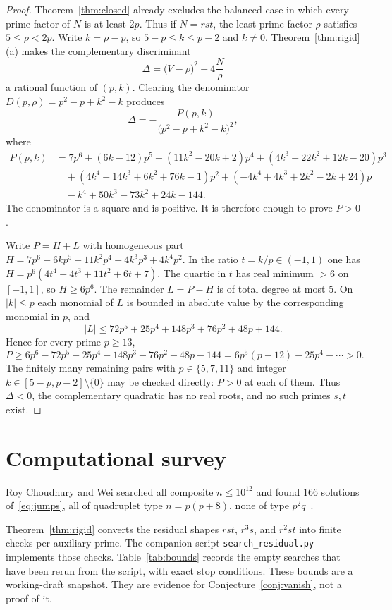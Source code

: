 \documentclass[11pt,reqno]{amsart}
\theoremstyle{definition}
\begin{document}
\begin{proof}
Theorem~\ref{thm:closed} already excludes the balanced case in which every prime factor of \(N\) is at least \(2p\). Thus if \(N=rst\), the least prime factor \(\rho\) satisfies \(5\le\rho<2p\). Write \(k=\rho-p\), so \(5-p\le k\le p-2\) and \(k\neq 0\). Theorem~\ref{thm:rigid}(a) makes the complementary discriminant
\[
\Delta=\bigl(V-\rho\bigr)^2-4\frac{N}{\rho}
\]
a rational function of \((p,k)\). Clearing the denominator \(D(p,\rho)=p^2-p+k^2-k\) produces
\[
\Delta=-\frac{P(p,k)}{\bigl(p^2-p+k^2-k\bigr)^2},
\]
where
\begin{align*}
P(p,k)&=7p^6+(6k-12)p^5+(11k^2-20k+2)p^4+(4k^3-22k^2+12k-20)p^3\\
&\quad+(4k^4-14k^3+6k^2+76k-1)p^2+(-4k^4+4k^3+2k^2-2k+24)p\\
&\quad-k^4+50k^3-73k^2+24k-144.
\end{align*}
The denominator is a square and is positive. It is therefore enough to prove \(P>0\).

Write \(P=H+L\) with homogeneous part \(H=7p^6+6kp^5+11k^2p^4+4k^3p^3+4k^4p^2\). In the ratio \(t=k/p\in(-1,1)\) one has \(H=p^6(4t^4+4t^3+11t^2+6t+7)\). The quartic in \(t\) has real minimum \(>6\) on \([-1,1]\), so \(H\ge 6p^6\). The remainder \(L=P-H\) is of total degree at most \(5\). On \(|k|\le p\) each monomial of \(L\) is bounded in absolute value by the corresponding monomial in \(p\), and
\[
|L|\le 72p^5+25p^4+148p^3+76p^2+48p+144.
\]
Hence for every prime \(p\ge 13\),
\[
P\ge 6p^6-72p^5-25p^4-148p^3-76p^2-48p-144=6p^5(p-12)-25p^4-\cdots>0.
\]
The finitely many remaining pairs with \(p\in\{5,7,11\}\) and integer \(k\in[5-p,p-2]\setminus\{0\}\) may be checked directly: \(P>0\) at each of them. Thus \(\Delta<0\), the complementary quadratic has no real roots, and no such primes \(s,t\) exist.
\end{proof}

\section{Computational survey}

\label{sec:comp}

Roy Choudhury and Wei searched all composite \(n\le 10^{12}\) and found \(166\) solutions of~\eqref{eq:jumps}, all of quadruplet type \(n=p(p+8)\), none of type \(p^2q\)~\cite{RCW2026}.

Theorem~\ref{thm:rigid} converts the residual shapes \(rst\), \(r^3s\), and \(r^2st\) into finite checks per auxiliary prime. The companion script \texttt{search\_residual.py} implements those checks. Table~\ref{tab:bounds} records the empty searches that have been rerun from the script, with exact stop conditions. These bounds are a working-draft snapshot. They are evidence for Conjecture~\ref{conj:vanish}, not a proof of it.
\end{document}
